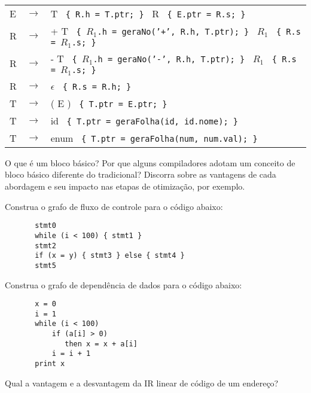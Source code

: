 \documentclass{compiladores}
\begin{document}
\begin{listanumerada}
\begin{tabular}{lll}
 E  &  $\rightarrow$  &  T \texttt{ \{ R.h = T.ptr; \} } R \texttt{ \{ E.ptr = R.s; \} }                                \\
 R  &  $\rightarrow$  &  + T \texttt{ \{ $R_1$.h = geraNo('+', R.h, T.ptr); \} } $R_1$ \texttt{ \{ R.s = $R_1$.s; \} }  \\
 R  &  $\rightarrow$  &  - T \texttt{ \{ $R_1$.h = geraNo('-', R.h, T.ptr); \} } $R_1$ \texttt{ \{ R.s = $R_1$.s; \} }  \\
 R  &  $\rightarrow$  &  $\epsilon$ \texttt{ \{ R.s = R.h; \} }                                                         \\
 T  &  $\rightarrow$  &  ( E ) \texttt{ \{ T.ptr = E.ptr; \} }                                                          \\
 T  &  $\rightarrow$  &  id \texttt{ \{ T.ptr = geraFolha(id, id.nome); \} }                                            \\
 T  &  $\rightarrow$  &  enum \texttt{ \{ T.ptr = geraFolha(num, num.val); \} }                                         \\
\end{tabular}

\item O que é um bloco básico? Por que alguns compiladores adotam um
  conceito de bloco básico diferente do tradicional? Discorra sobre as
  vantagens de cada abordagem e seu impacto nas etapas de otimização,
  por exemplo.

\item Construa o grafo de fluxo de controle para o código abaixo:
  
  \begin{lstlisting}
       stmt0
       while (i < 100) { stmt1 }
       stmt2
       if (x = y) { stmt3 } else { stmt4 }
       stmt5
  \end{lstlisting}

\item Construa o grafo de dependência de dados para o código abaixo:

  \begin{lstlisting}
       x = 0
       i = 1
       while (i < 100)
           if (a[i] > 0)
              then x = x + a[i]
           i = i + 1
       print x
    \end{lstlisting}

\item Qual a vantagem e a desvantagem da IR linear de código de um endereço?


\end{listanumerada}
\end{document}
